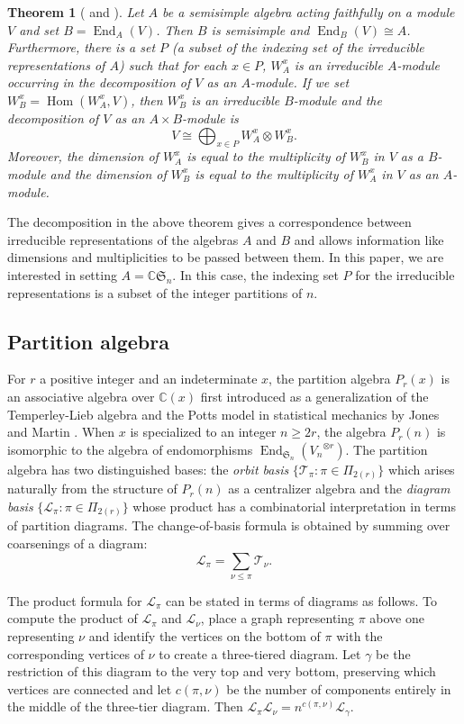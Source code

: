 \documentclass[10pt]{amsart}
\theoremstyle{definition}
\theoremstyle{definition}
\theoremstyle{plain}
\theoremstyle{remark}
\theoremstyle{plain}
\newtheorem{theorem}[theorem]{Theorem}
\theoremstyle{plain}
\newcommand{\C}{\mathbb{C}}
\newcommand{\TT}{\mathcal{T}}
\newcommand{\LL}{\mathcal{L}}
\newcommand{\SG}{\mathfrak{S}}
\newcommand{\defn}[1]{\textcolor{defncolor}{\emph{#1}}}
\DeclareMathOperator{\End}{End}
\DeclareMathOperator{\Hom}{Hom}
\begin{document}
\begin{theorem}[{\cite[Section 6.2.5]{procesi} and \cite[Section 4.2.1]{gw}}] Let $A$ be a semisimple algebra acting faithfully on a module $V$ and set $B=\End_A(V)$. Then $B$ is semisimple and $\End_B(V)\cong A$. Furthermore, there is a set $P$ (a subset of the indexing set of the irreducible representations of $A$) such that for each $x\in P$, $W_A^x$ is an irreducible $A$-module occurring in the decomposition of $V$ as an $A$-module. If we set $W_B^x=\Hom(W_A^x, V)$, then $W_B^x$ is an irreducible $B$-module and the decomposition of $V$ as an $A\times B$-module is \[V\cong\bigoplus_{x\in P}W_A^x\otimes W_B^x.\] Moreover, the dimension of $W_A^x$ is equal to the multiplicity of $W_B^x$ in $V$ as a $B$-module and the dimension of $W_B^x$ is equal to the multiplicity of $W_A^x$ in $V$ as an $A$-module.
\end{theorem}

The decomposition in the above theorem gives a correspondence between irreducible representations of the algebras $A$ and $B$ and allows information like dimensions and multiplicities to be passed between them. In this paper, we are interested in setting $A=\C\SG_n$. In this case, the indexing set $P$ for the irreducible representations is a subset of the integer partitions of $n$.

\subsection{Partition algebra}\label{sec:partitionalgebra}

For $r$ a positive integer and an indeterminate $x$, the partition algebra $P_r(x)$ is an associative algebra over $\C(x)$ first introduced as a generalization of the Temperley-Lieb algebra and the Potts model in statistical mechanics by Jones \cite{jones1993potts} and Martin \cite{martin, Martin1994AlgebrasIH}. When $x$ is specialized to an integer $n\geq 2r$, the algebra $P_r(n)$ is isomorphic to the algebra of endomorphisms $\End_{\SG_n}({V_n}^{\otimes r})$. The partition algebra has two distinguished bases: the \defn{orbit basis} $\{\TT_\pi:\pi\in\Pi_{2(r)}\}$ which arises naturally from the structure of $P_r(n)$ as a centralizer algebra and the \defn{diagram basis} $\{\LL_\pi:\pi\in\Pi_{2(r)}\}$ whose product has a combinatorial interpretation in terms of partition diagrams. The change-of-basis formula is obtained by summing over coarsenings of a diagram: \[\LL_\pi=\sum_{\nu\leq\pi}\TT_\nu.\]

The product formula for $\LL_\pi$ can be stated in terms of diagrams as follows. To compute the product of $\LL_\pi$ and $\LL_\nu$, place a graph representing $\pi$ above one representing $\nu$ and identify the vertices on the bottom of $\pi$ with the corresponding vertices of $\nu$ to create a three-tiered diagram. Let $\gamma$ be the restriction of this diagram to the very top and very bottom, preserving which vertices are connected and let $c(\pi,\nu)$ be the number of components entirely in the middle of the three-tier diagram. Then $\LL_\pi\LL_\nu=n^{c(\pi,\nu)}\LL_\gamma$.
\end{document}
